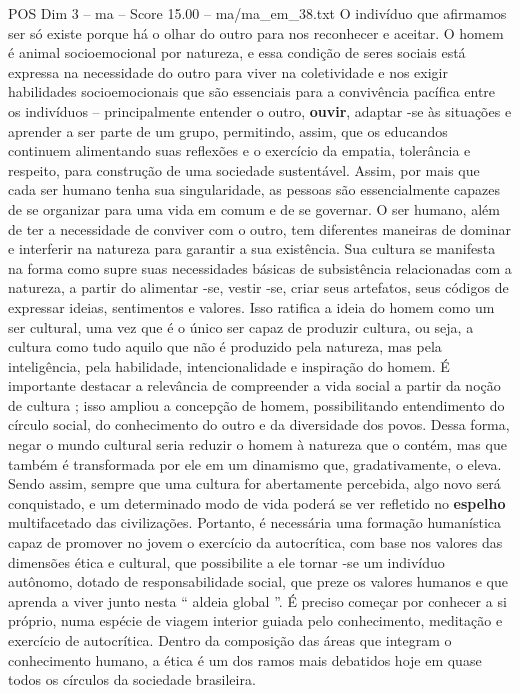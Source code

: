 \begin{textsample}{POS Dim 3 – ma – Score 15.00 – ma/ma\_em\_38.txt}
O indivíduo que afirmamos ser só existe porque há o olhar do outro para nos reconhecer e aceitar.
O homem é animal socioemocional por natureza, e essa condição de seres sociais está expressa na necessidade do outro para viver na coletividade e nos exigir habilidades socioemocionais que são essenciais para a convivência pacífica entre os indivíduos – principalmente entender o outro, \textbf{ouvir}, adaptar -se às situações e aprender a ser parte de um grupo, permitindo, assim, que os educandos continuem alimentando suas reflexões e o exercício da empatia, tolerância e respeito, para construção de uma sociedade sustentável.
Assim, por mais que cada ser humano tenha sua singularidade, as pessoas são essencialmente capazes de se organizar para uma vida em comum e de se governar.
O ser humano, além de ter a necessidade de conviver com o outro, tem diferentes maneiras de dominar e interferir na natureza para garantir a sua existência.
Sua cultura se manifesta na forma como supre suas necessidades básicas de subsistência relacionadas com a natureza, a partir do alimentar -se, vestir -se, criar seus artefatos, seus códigos de expressar ideias, sentimentos e valores.
Isso ratifica a ideia do homem como um ser cultural, uma vez que é o único ser capaz de produzir cultura, ou seja, a cultura como tudo aquilo que não é produzido pela natureza, mas pela inteligência, pela habilidade, intencionalidade e inspiração do homem.
É importante destacar a relevância de compreender a vida social a partir da noção de cultura ; isso ampliou a concepção de homem, possibilitando entendimento do círculo social, do conhecimento do outro e da diversidade dos povos.
Dessa forma, negar o mundo cultural seria reduzir o homem à natureza que o contém, mas que também é transformada por ele em um dinamismo que, gradativamente, o eleva.
Sendo assim, sempre que uma cultura for abertamente percebida, algo novo será conquistado, e um determinado modo de vida poderá se ver refletido no \textbf{espelho} multifacetado das civilizações.
Portanto, é necessária uma formação humanística capaz de promover no jovem o exercício da autocrítica, com base nos valores das dimensões ética e cultural, que possibilite a ele tornar -se um indivíduo autônomo, dotado de responsabilidade social, que preze os valores humanos e que aprenda a viver junto nesta “ aldeia global ”.
É preciso começar por conhecer a si próprio, numa espécie de viagem interior guiada pelo conhecimento, meditação e exercício de autocrítica.
Dentro da composição das áreas que integram o conhecimento humano, a ética é um dos ramos mais debatidos hoje em quase todos os círculos da sociedade brasileira.

\end{textsample}
